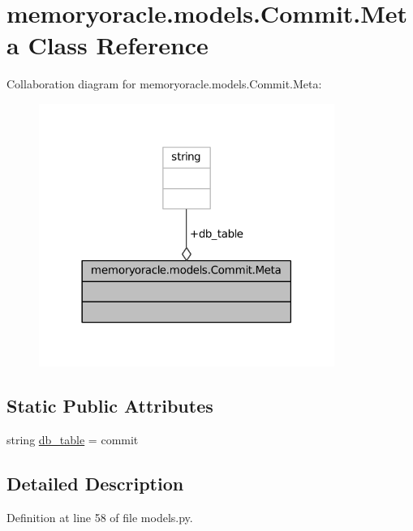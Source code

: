 \hypertarget{classmemoryoracle_1_1models_1_1Commit_1_1Meta}{}\section{memoryoracle.\+models.\+Commit.\+Meta Class Reference}
\label{classmemoryoracle_1_1models_1_1Commit_1_1Meta}


Collaboration diagram for memoryoracle.\+models.\+Commit.\+Meta\+:\nopagebreak
\begin{figure}[H]
\begin{center}
\leavevmode
\includegraphics[width=273pt]{classmemoryoracle_1_1models_1_1Commit_1_1Meta__coll__graph}
\end{center}
\end{figure}
\subsection*{Static Public Attributes}
\begin{DoxyCompactItemize}
\item 
string \hyperlink{classmemoryoracle_1_1models_1_1Commit_1_1Meta_a45bf44b735f44732d07f38178af439b3}{db\+\_\+table} = \textquotesingle{}commit\textquotesingle{}
\end{DoxyCompactItemize}


\subsection{Detailed Description}


Definition at line 58 of file models.\+py.



